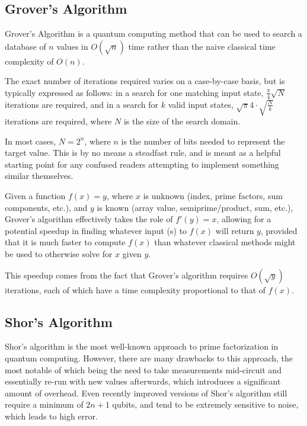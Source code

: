 \documentclass[twocolumn]{cinc}
\begin{document}
  \subsection{Grover's Algorithm}

  Grover's Algorithm is a quantum computing method 
  that can be used to search a database of $n$ values in $O(\sqrt{n})$ time 
  rather than the naive classical time complexity of $O(n)$\cite{grover}. 

  The exact number of iterations required varies on a case-by-case basis,
  but is typically expressed as follows: in a search for one matching input
  state, $\frac{\pi}{4}\sqrt{N}$ iterations are required, and in a search
  for $k$ valid input states, $\sqrt{\pi}{4}\cdot \sqrt{\frac{N}{k}}$
  iterations are required, where $N$ is the size of the search domain.

  In most cases, $N=2^n$, where $n$ is the number of bits needed to represent
  the target value. This is by no means a steadfast rule, and is meant as 
  a helpful starting point for any confused readers attempting to implement
  something similar themselves.
  
  Given a function $f(x)=y$, where $x$ is unknown (index, prime factors, 
  sum components, etc.), and $y$ is known (array value, semiprime/product, 
  sum, etc.), Grover's algorithm effectively takes the role of $f'(y)=x$, 
  allowing for a potential speedup in finding whatever input (s) to $f(x)$
  will return $y$, provided that it is much faster to compute $f(x)$ than
  whatever classical methods might be used to otherwise solve for $x$ given $y$.

  This speedup comes from the fact that Grover's algorithm requires 
  $O(\sqrt{y})$ iterations, each of which have a time complexity proportional
  to that of $f(x)$.

  \subsection{Shor's Algorithm}

  Shor's algorithm is the most well-known approach to prime factorization
  in quantum computing. However, there are many drawbacks to this approach,
  the most notable of which being the need to take measurements mid-circuit
  and essentially re-run with new values afterwards, which introduces a 
  significant amount of overhead. Even recently improved versions of Shor's
  algorithm still require a minimum of $2n+1$ qubits, and tend to be 
  extremely sensitive to noise, which leads to high error\cite{quantum_factoring,shor}.
\end{document}
